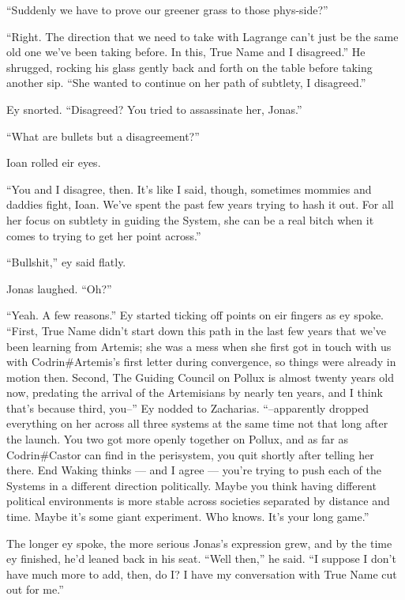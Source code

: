 ``Suddenly we have to prove our greener grass to those phys-side?''

``Right. The direction that we need to take with Lagrange can't just be the same old one we've been taking before. In this, True Name and I disagreed.'' He shrugged, rocking his glass gently back and forth on the table before taking another sip. ``She wanted to continue on her path of subtlety, I disagreed.''

Ey snorted. ``Disagreed? You tried to assassinate her, Jonas.''

``What are bullets but a disagreement?''

Ioan rolled eir eyes.

``You and I disagree, then. It's like I said, though, sometimes mommies and daddies fight, Ioan. We've spent the past few years trying to hash it out. For all her focus on subtlety in guiding the System, she can be a real bitch when it comes to trying to get her point across.''

``Bullshit,'' ey said flatly.

Jonas laughed. ``Oh?''

``Yeah. A few reasons.'' Ey started ticking off points on eir fingers as ey spoke. ``First, True Name didn't start down this path in the last few years that we've been learning from Artemis; she was a mess when she first got in touch with us with Codrin\#Artemis's first letter during convergence, so things were already in motion then. Second, The Guiding Council on Pollux is almost twenty years old now, predating the arrival of the Artemisians by nearly ten years, and I think that's because third, you--'' Ey nodded to Zacharias. ``--apparently dropped everything on her across all three systems at the same time not that long after the launch. You two got more openly together on Pollux, and as far as Codrin\#Castor can find in the perisystem, you quit shortly after telling her there. End Waking thinks — and I agree — you're trying to push each of the Systems in a different direction politically. Maybe you think having different political environments is more stable across societies separated by distance and time. Maybe it's some giant experiment. Who knows. It's your long game.''

The longer ey spoke, the more serious Jonas's expression grew, and by the time ey finished, he'd leaned back in his seat. ``Well then,'' he said. ``I suppose I don't have much more to add, then, do I? I have my conversation with True Name cut out for me.''

